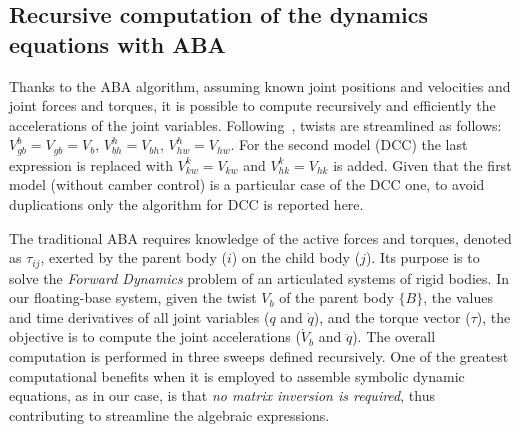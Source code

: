 \subsection{Recursive computation of the dynamics equations with ABA}
\label{sec:aba}
Thanks to the ABA algorithm, assuming known joint positions and velocities and joint forces and torques, it is possible to compute recursively and efficiently the accelerations of the joint variables. Following~\cite{Domenighini:Designs:2023}, twists are streamlined as follows: $V_{gb}^b = V_{gb} = V_b$, $V_{bh}^h=V_{bh}$, $V_{hw}^h=V_{hw}$. For the second model (DCC) the last expression is replaced with $V_{kw}^k=V_{kw}$ and $V_{hk}^k=V_{hk}$ is added. Given that the first model (without camber control) is a particular case of the DCC one, to avoid duplications only the algorithm for DCC is reported here.

The traditional ABA requires knowledge of the active forces and torques, denoted as $\tau_{ij}$, exerted by the parent body ($i$) on the child body ($j$). Its purpose is to solve the \emph{Forward Dynamics} problem of an articulated systems of rigid bodies. In our floating-base system, given the twist $V_b$ of the parent body $\{B\}$, the values and time derivatives of all joint variables ($q$ and $\dot{q}$), and the torque vector ($\tau$), the objective is to compute the joint accelerations ($\dot{V}_{b}$ and $\ddot{q}$).
The overall computation is performed in three sweeps defined recursively. One of the greatest computational benefits when it is employed to assemble symbolic dynamic equations, as in our case, is that \emph{no matrix inversion is required}, thus contributing to streamline the algebraic expressions.

